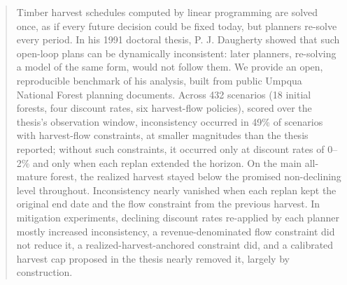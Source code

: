 \begin{abstract}
Timber harvest schedules computed by linear programming are solved once, as if every future decision could be fixed today, but planners re-solve every period. In his 1991 doctoral thesis, P. J. Daugherty showed that such open-loop plans can be dynamically inconsistent: later planners, re-solving a model of the same form, would not follow them. We provide an open, reproducible benchmark of his analysis, built from public Umpqua National Forest planning documents. Across 432 scenarios (18 initial forests, four discount rates, six harvest-flow policies), scored over the thesis's observation window, inconsistency occurred in 49\% of scenarios with harvest-flow constraints, at smaller magnitudes than the thesis reported; without such constraints, it occurred only at discount rates of 0--2\% and only when each replan extended the horizon. On the main all-mature forest, the realized harvest stayed below the promised non-declining level throughout. Inconsistency nearly vanished when each replan kept the original end date and the flow constraint from the previous harvest. In mitigation experiments, declining discount rates re-applied by each planner mostly increased inconsistency, a revenue-denominated flow constraint did not reduce it, a realized-harvest-anchored constraint did, and a calibrated harvest cap proposed in the thesis nearly removed it, largely by construction.
\end{abstract}
